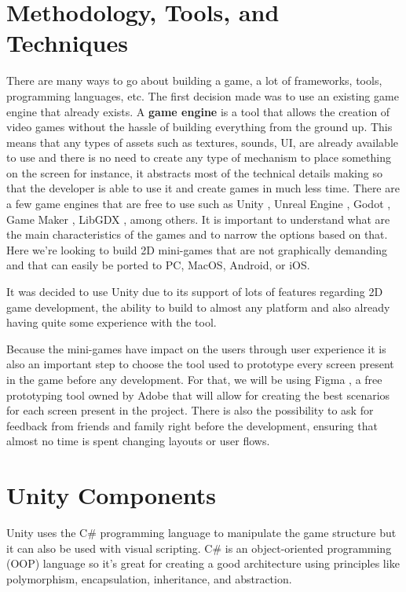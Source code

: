 
\section{Methodology, Tools, and Techniques}
\label{methodology}
There are many ways to go about building a game, a lot of frameworks, tools, programming languages, etc. The first decision made was to use an existing game engine that already exists. A \textbf{game engine} is a tool that allows the creation of video games without the hassle of building everything from the ground up. This means that any types of assets such as textures, sounds, UI, are already available to use and there is no need to create any type of mechanism to place something on the screen for instance, it abstracts most of the technical details making so that the developer is able to use it and create games in much less time. There are a few game engines that are free to use such as Unity \cite{unity}, Unreal Engine \cite{unrealengine}, Godot \cite{godot}, Game Maker \cite{gamemaker}, LibGDX \cite{libgdx}, among others.
It is important to understand what are the main characteristics of the games and to narrow the options based on that.
Here we're looking to build 2D mini-games that are not graphically demanding and that can easily be ported to PC, MacOS, Android, or iOS.

It was decided to use Unity due to its support of lots of features regarding 2D game development, the ability to build to almost any platform and also already having quite some experience with the tool.

Because the mini-games have impact on the users through user experience it is also an important step to choose the tool used to prototype every screen present in the game before any development. For that, we will be using Figma \cite{figma}, a free prototyping tool owned by Adobe that will allow for creating the best scenarios for each screen present in the project. There is also the possibility to ask for feedback from friends and family right before the development, ensuring that almost no time is spent changing layouts or user flows.

\section{Unity Components}
Unity uses the C\# programming language to manipulate the game structure but it can also be used with visual scripting. C\# is an object-oriented programming (OOP) language so it's great for creating a good architecture using principles like polymorphism, encapsulation, inheritance, and abstraction.

